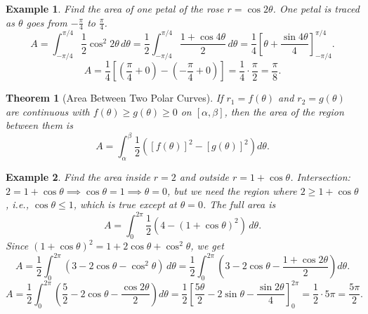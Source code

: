\documentclass[11pt,a4paper]{article}
\newtheorem{example}{Example}
\newtheorem{theorem}{Theorem}
\begin{document}
\begin{example}
Find the area of one petal of the rose $r = \cos 2\theta$.
One petal is traced as $\theta$ goes from $-\frac{\pi}{4}$ to $\frac{\pi}{4}$.
\[
A = \int_{-\pi/4}^{\pi/4} \frac{1}{2} \cos^2 2\theta \, d\theta = \frac{1}{2} \int_{-\pi/4}^{\pi/4} \frac{1 + \cos 4\theta}{2} \, d\theta = \frac{1}{4} \left[ \theta + \frac{\sin 4\theta}{4} \right]_{-\pi/4}^{\pi/4}.
\]
\[
A = \frac{1}{4} \left[ \left( \frac{\pi}{4} + 0 \right) - \left( -\frac{\pi}{4} + 0 \right) \right] = \frac{1}{4} \cdot \frac{\pi}{2} = \frac{\pi}{8}.
\]
\end{example}
\begin{theorem}[Area Between Two Polar Curves]
If $r_1 = f(\theta)$ and $r_2 = g(\theta)$ are continuous with $f(\theta) \geq g(\theta) \geq 0$ on $[\alpha, \beta]$, then the area of the region between them is
\[
A = \int_{\alpha}^{\beta} \frac{1}{2} \left( [f(\theta)]^2 - [g(\theta)]^2 \right) d\theta.
\]
\end{theorem}
\begin{example}
Find the area inside $r = 2$ and outside $r = 1 + \cos \theta$.
Intersection: $2 = 1 + \cos \theta \implies \cos \theta = 1 \implies \theta = 0$, but we need the region where $2 \geq 1 + \cos \theta$, i.e., $\cos \theta \leq 1$, which is true except at $\theta = 0$. The full area is
\[
A = \int_0^{2\pi} \frac{1}{2} (4 - (1 + \cos \theta)^2) \, d\theta.
\]
Since $(1 + \cos \theta)^2 = 1 + 2\cos \theta + \cos^2 \theta$, we get
\[
A = \frac{1}{2} \int_0^{2\pi} (3 - 2\cos \theta - \cos^2 \theta) \, d\theta = \frac{1}{2} \int_0^{2\pi} \left( 3 - 2\cos \theta - \frac{1 + \cos 2\theta}{2} \right) d\theta.
\]
\[
A = \frac{1}{2} \int_0^{2\pi} \left( \frac{5}{2} - 2\cos \theta - \frac{\cos 2\theta}{2} \right) d\theta = \frac{1}{2} \left[ \frac{5\theta}{2} - 2\sin \theta - \frac{\sin 2\theta}{4} \right]_0^{2\pi} = \frac{1}{2} \cdot 5\pi = \frac{5\pi}{2}.
\]
\end{example}
\end{document}
